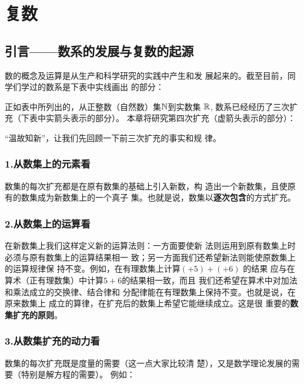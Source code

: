 \chapter{复数}

\section{引言——数系的发展与复数的起源}
数的概念及运算是从生产和科学研究的实践中产生和发
展起来的。截至目前，同学们学过的数系是下表中实线画出
的部分：












正如表中所列出的，从正整数（自然数）集$\mathbb{N}$到实数集
$\mathbb{R}$, 数系已经经历了三次扩充（下表中实箭头表示的部分）。
本章将研究第四次扩充（虚箭头表示的部分）：










“温故知新”，让我们先回顾一下前三次扩充的事实和规
律。

\subsection*{1.从数集上的元素看}
数集的每次扩充都是在原有数集的基础上引入新数，构
造出一个新数集，且使原有的数集成为新数集上的一个真子
集。也就是说，数集以\textbf{逐次包含}的方式扩充。

\subsection*{2.从数集上的运算看}
在新数集上我们这样定义新的运算法则：一方面要使新
法则运用到原有数集上时必须与原有数集上的运算结果相一
致；另一方面我们还希望新法则能使原数集上的运算规律保
持不变。例如，在有理数集上计算$(+5)+(+6)$
的结果
应与在算术（正有理数集）中计算$5+6$的结果相一致，而且
我们还希望在算术中对加法和乘法成立的交换律、结合律和
分配律能在有理数集上保持不变。也就是说，在原来数集上
成立的算律，在扩充后的数集上希望它能继续成立。这是很
重要的\textbf{数集扩充的原则}。


\subsection*{3.从数集扩充的动力看}
数集的每次扩充既是度量的需要（这一点大家比较清
楚），又是数学理论发展的需要（特别是解方程的需要）。
例如：

